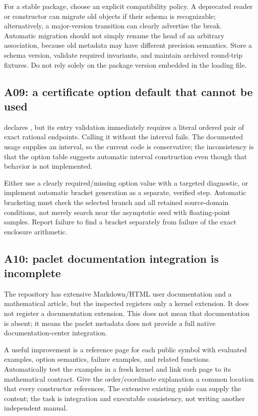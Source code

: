 For a stable package, choose an explicit compatibility policy. A deprecated reader or constructor can migrate old objects if their schema is recognizable; alternatively, a major-version transition can clearly advertise the break. Automatic migration should not simply rename the head of an arbitrary association, because old metadata may have different precision semantics. Store a schema version, validate required invariants, and maintain archived round-trip fixtures. Do not rely solely on the package version embedded in the loading file.

\subsection{A09: a certificate option default that cannot be used}
 declares , but its entry validation immediately requires a literal ordered pair of exact rational endpoints. Calling it without the interval fails. The documented usage supplies an interval, so the current code is conservative; the inconsistency is that the option table suggests automatic interval construction even though that behavior is not implemented.\cite{certificates,guide}

Either use a clearly required/missing option value with a targeted diagnostic, or implement automatic bracket generation as a separate, verified step. Automatic bracketing must check the selected branch and all retained source-domain conditions, not merely search near the asymptotic seed with floating-point samples. Report failure to find a bracket separately from failure of the exact enclosure arithmetic.

\subsection{A10: paclet documentation integration is incomplete}
The repository has extensive Markdown/HTML user documentation and a mathematical article, but the inspected  registers only a kernel extension. It does not register a documentation extension. This does not mean that documentation is absent; it means the paclet metadata does not provide a full native documentation-center integration.\cite{paclet,guide,development}

A useful improvement is a reference page for each public symbol with evaluated examples, option semantics, failure examples, and related functions. Automatically test the examples in a fresh kernel and link each page to its mathematical contract. Give the order/coordinate explanation a common location that every constructor references. The extensive existing guide can supply the content; the task is integration and executable consistency, not writing another independent manual.


